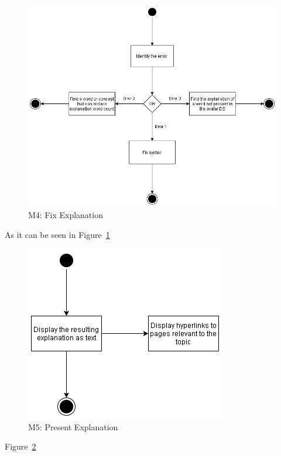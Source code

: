 \begin{figure}[H]
\centering
\includegraphics[width=\textwidth,keepaspectratio]{ch4/assets/M4.png}
\caption[Fix Explanation Module]{M4: Fix Explanation}
\label{fig:M4}
\end{figure}

As it can be seen in Figure~\ref{fig:M4}

\begin{figure}[H]
\centering
\includegraphics[scale=0.5]{ch4/assets/M5.png}
\caption[Present Explanation Module]{M5: Present Explanation}
\label{fig:M5}
\end{figure}

Figure~\ref{fig:M5}

